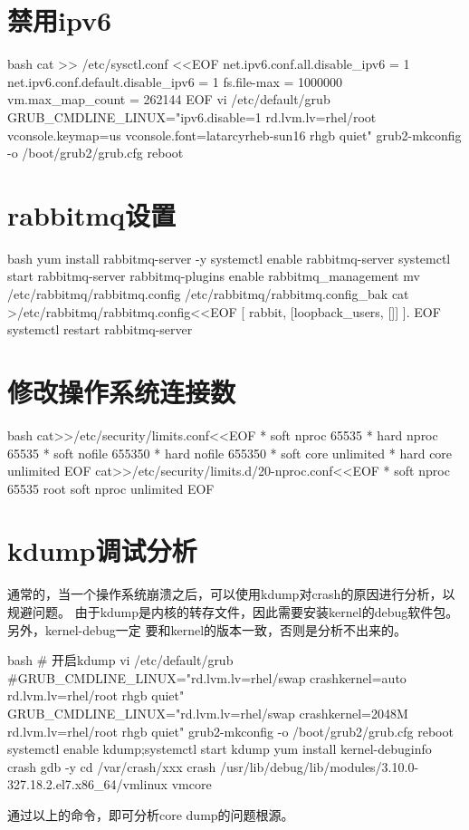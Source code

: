 \section{禁用ipv6}
\begin{code-block}{bash}
cat >> /etc/sysctl.conf <<EOF
net.ipv6.conf.all.disable_ipv6 = 1
net.ipv6.conf.default.disable_ipv6 = 1
fs.file-max = 1000000
vm.max_map_count = 262144
EOF
vi /etc/default/grub
GRUB_CMDLINE_LINUX="ipv6.disable=1 rd.lvm.lv=rhel/root vconsole.keymap=us vconsole.font=latarcyrheb-sun16 rhgb quiet"
grub2-mkconfig -o /boot/grub2/grub.cfg
reboot
\end{code-block}

\section{rabbitmq设置}
\begin{code-block}{bash}
yum install rabbitmq-server -y
systemctl enable rabbitmq-server
systemctl start rabbitmq-server
rabbitmq-plugins enable rabbitmq_management
mv /etc/rabbitmq/rabbitmq.config /etc/rabbitmq/rabbitmq.config_bak
cat >/etc/rabbitmq/rabbitmq.config<<EOF
[
{rabbit, [{loopback_users, []}]}
].
EOF
systemctl restart rabbitmq-server
\end{code-block}

\section{修改操作系统连接数}
\begin{code-block}{bash}
cat>>/etc/security/limits.conf<<EOF
*               soft    nproc           65535
*               hard    nproc           65535
*               soft    nofile          655350
*               hard    nofile          655350
*               soft    core            unlimited
*               hard    core            unlimited
EOF
cat>>/etc/security/limits.d/20-nproc.conf<<EOF
*          soft    nproc     65535
root       soft    nproc     unlimited
EOF
\end{code-block}

\section{kdump调试分析}
通常的，当一个操作系统崩溃之后，可以使用kdump对crash的原因进行分析，以规避问题。
由于kdump是内核的转存文件，因此需要安装kernel的debug软件包。另外，kernel-debug一定
要和kernel的版本一致，否则是分析不出来的。
\begin{code-block}{bash}
# 开启kdump
vi /etc/default/grub
#GRUB_CMDLINE_LINUX="rd.lvm.lv=rhel/swap crashkernel=auto rd.lvm.lv=rhel/root rhgb quiet"
GRUB_CMDLINE_LINUX="rd.lvm.lv=rhel/swap crashkernel=2048M rd.lvm.lv=rhel/root rhgb quiet"
grub2-mkconfig -o /boot/grub2/grub.cfg
reboot
systemctl enable kdump;systemctl start kdump
yum install kernel-debuginfo crash gdb -y
cd /var/crash/xxx
crash /usr/lib/debug/lib/modules/3.10.0-327.18.2.el7.x86_64/vmlinux vmcore
\end{code-block}
通过以上的命令，即可分析core dump的问题根源。

